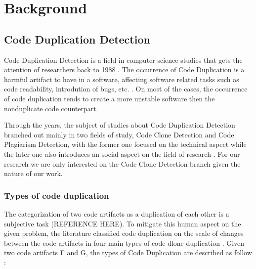 
\en

\chapter{Background}

\section{Code Duplication Detection}

Code Duplication Detection is a field in computer science studies that gets the attention of researchers back to 1988 \citep{firstman}.
The occurrence of Code Duplication is a harmful artifact to have in a software, affecting software related tasks such as code readability,
introdution of bugs, etc.   \citep{harmone}. 
On most of the cases, the occurrence of code duplication tends to create a more unstable software then the nonduplicate code counterpart.   \citep{harmtwo}

Through the years, the subject of studies about Code Duplication Detection branched out mainly in two fields of study,
Code Clone Detection and Code Plagiarism Detection,
with the former one focused on the technical aspect while the later one also introduces an social aspect on the field of research
\citep{litreview}. For our research we are only interested on the Code Clone Detection branch given the nature of our work.



\subsection{Types of code duplication}

The categorization of two code artifacts as a duplication of each other is a subjective task (REFERENCE HERE). 
To mitigate this human aspect on the given problem, the literature classified code duplication on the scale of changes between 
the code artifacts in four main types of code dlone duplication \citep{litreview}. Given two code artifacts F and G, 
the types of Code Duplication are described as follow \citep{litreview}:

